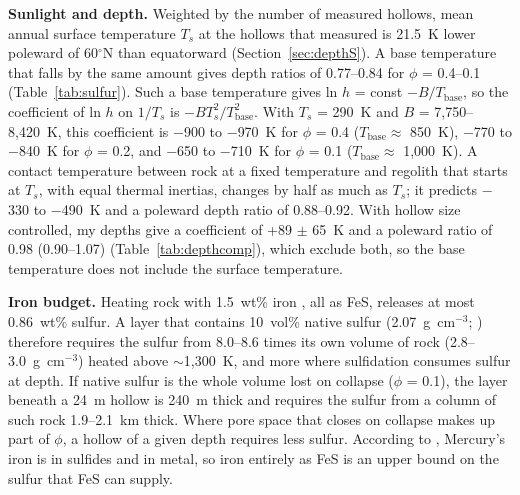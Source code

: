 \documentclass{planetary}
\begin{document}
\textbf{Sunlight and depth.} Weighted by the number of measured hollows, mean annual surface temperature $T_s$ at the hollows that \textcite{blewett2016} measured is 21.5~K lower poleward of 60$^\circ$N than equatorward (Section~\ref{sec:depthS}). A base temperature that falls by the same amount gives depth ratios of 0.77--0.84 for $\phi$ = 0.4--0.1 (Table~\ref{tab:sulfur}). Such a base temperature gives ln $h$ = const $- B/T_\mathrm{base}$, so the coefficient of ln $h$ on $1/T_s$ is $-B T_s^2/T_\mathrm{base}^2$. With $T_s$ = 290~K and $B$ = 7,750--8,420~K, this coefficient is $-$900 to $-$970~K for $\phi$ = 0.4 ($T_\mathrm{base} \approx$ 850~K), $-$770 to $-$840~K for $\phi$ = 0.2, and $-$650 to $-$710~K for $\phi$ = 0.1 ($T_\mathrm{base} \approx$ 1,000~K). A contact temperature between rock at a fixed temperature and regolith that starts at $T_s$, with equal thermal inertias, changes by half as much as $T_s$; it predicts $-$330 to $-$490~K and a poleward depth ratio of 0.88--0.92. With hollow size controlled, my depths give a coefficient of +89 $\pm$ 65~K and a poleward ratio of 0.98 (0.90--1.07) (Table~\ref{tab:depthcomp}), which exclude both, so the base temperature does not include the surface temperature.

\textbf{Iron budget.} Heating rock with 1.5~wt\% iron \parencite{weider2014}, all as FeS, releases at most 0.86~wt\% sulfur. A layer that contains 10~vol\% native sulfur (2.07~g~cm$^{-3}$; \cite{lide2007}) therefore requires the sulfur from 8.0--8.6 times its own volume of rock (2.8--3.0~g~cm$^{-3}$) heated above $\sim$1,300~K, and more where sulfidation consumes sulfur at depth. If native sulfur is the whole volume lost on collapse ($\phi$ = 0.1), the layer beneath a 24~m hollow is 240~m thick and requires the sulfur from a column of such rock 1.9--2.1~km thick. Where pore space that closes on collapse makes up part of $\phi$, a hollow of a given depth requires less sulfur. According to \textcite{weider2014}, Mercury's iron is in sulfides and in metal, so iron entirely as FeS is an upper bound on the sulfur that FeS can supply.
\end{document}
